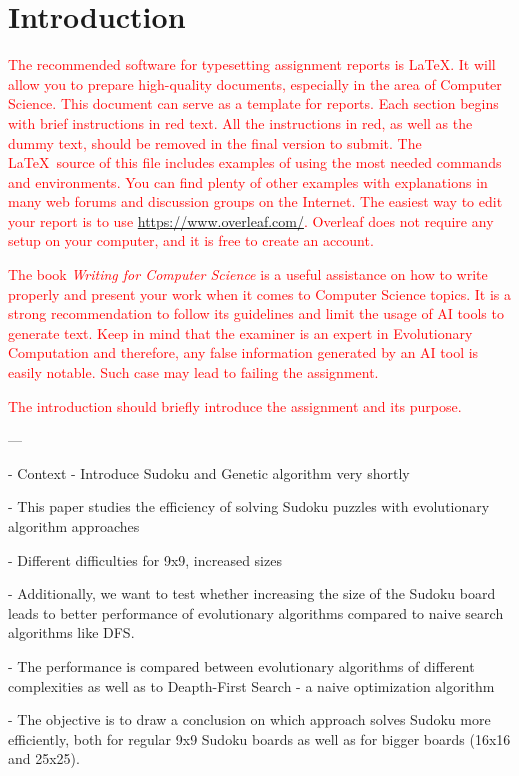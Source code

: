 \section{Introduction}
\label{sec:intro}

\textcolor{red}{The recommended software for typesetting assignment reports is \LaTeX. It will allow you to prepare high-quality documents, especially in the area of Computer Science. This document can serve as a template for reports. Each section begins with brief instructions in red text. All the instructions in red, as well as the dummy text, should be removed in the final version to submit. The \LaTeX\ source of this file includes examples of using the most needed commands and environments. You can find plenty of other examples with explanations in many web forums and discussion groups on the Internet. The easiest way to edit your report is to use \url{https://www.overleaf.com/}. Overleaf does not require any setup on your computer, and it is free to create an account.}

\textcolor{red}{The book \textit{Writing for Computer Science} \cite{zobel2014writing} is a useful assistance on how to write properly and present your work when it comes to Computer Science topics. It is a strong recommendation to follow its guidelines and limit the usage of AI tools to generate text. Keep in mind that the examiner is an expert in Evolutionary Computation and therefore, any false information generated by an AI tool is easily notable. Such case may lead to failing the assignment.}

\textcolor{red}{The introduction should briefly introduce the assignment and its purpose.}

---

- Context
- Introduce Sudoku and Genetic algorithm very shortly

- This paper studies the efficiency of solving Sudoku puzzles  with evolutionary algorithm approaches

- Different difficulties for 9x9, increased sizes

- Additionally, we want to test whether increasing the size of the Sudoku board leads to better performance of evolutionary algorithms compared to naive search algorithms like DFS.

- The performance is compared between evolutionary algorithms of different complexities as well as to Deapth-First Search - a naive optimization algorithm 

- The objective is to draw a conclusion on which approach solves Sudoku more efficiently, both for regular 9x9 Sudoku boards as well as for bigger boards (16x16 and 25x25).


